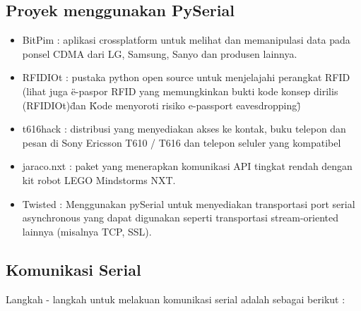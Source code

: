 	\subsection{Proyek menggunakan PySerial}
		\begin{itemize}
			\item BitPim : aplikasi crossplatform untuk melihat dan memanipulasi data pada ponsel CDMA dari LG, Samsung, Sanyo dan produsen lainnya.
			\item RFIDIOt : pustaka python open source untuk menjelajahi perangkat RFID (lihat juga \"e-paspor RFID yang memungkinkan bukti kode konsep dirilis 
			(RFIDIOt)\" dan \"Kode menyoroti risiko e-passport eavesdropping\")
			\item t616hack : distribusi yang menyediakan akses ke kontak, buku telepon dan pesan di Sony Ericsson T610 / T616 dan telepon seluler yang kompatibel
			\item jaraco.nxt : paket yang menerapkan komunikasi API tingkat rendah dengan kit robot LEGO Mindstorms NXT.
			\item Twisted : Menggunakan pySerial untuk menyediakan transportasi port serial asynchronous yang dapat digunakan seperti transportasi stream-oriented 
			lainnya (misalnya TCP, SSL).
		\end{itemize}
	
	\subsection{Komunikasi Serial}
		Langkah - langkah untuk melakuan komunikasi serial adalah sebagai berikut :
		
